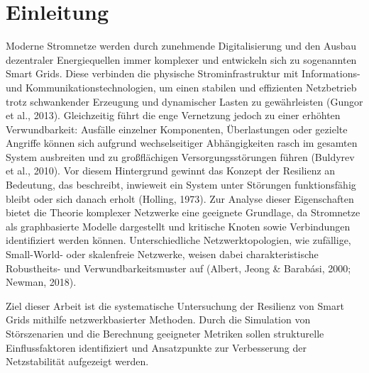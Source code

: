 \section{Einleitung}
Moderne Stromnetze werden durch zunehmende Digitalisierung und den Ausbau dezentraler Energiequellen immer komplexer und entwickeln sich zu sogenannten Smart Grids. Diese verbinden die physische Strominfrastruktur mit Informations- und Kommunikationstechnologien, um einen stabilen und effizienten Netzbetrieb trotz schwankender Erzeugung und dynamischer Lasten zu gewährleisten (Gungor et al., 2013). Gleichzeitig führt die enge Vernetzung jedoch zu einer erhöhten Verwundbarkeit: Ausfälle einzelner Komponenten, Überlastungen oder gezielte Angriffe können sich aufgrund wechselseitiger Abhängigkeiten rasch im gesamten System ausbreiten und zu großflächigen Versorgungsstörungen führen (Buldyrev et al., 2010). Vor diesem Hintergrund gewinnt das Konzept der Resilienz an Bedeutung, das beschreibt, inwieweit ein System unter Störungen funktionsfähig bleibt oder sich danach erholt (Holling, 1973). Zur Analyse dieser Eigenschaften bietet die Theorie komplexer Netzwerke eine geeignete Grundlage, da Stromnetze als graphbasierte Modelle dargestellt und kritische Knoten sowie Verbindungen identifiziert werden können. Unterschiedliche Netzwerktopologien, wie zufällige, Small-World- oder skalenfreie Netzwerke, weisen dabei charakteristische Robustheits- und Verwundbarkeitsmuster auf (Albert, Jeong & Barabási, 2000; Newman, 2018).

Ziel dieser Arbeit ist die systematische Untersuchung der Resilienz von Smart Grids mithilfe netzwerkbasierter Methoden. Durch die Simulation von Störszenarien und die Berechnung geeigneter Metriken sollen strukturelle Einflussfaktoren identifiziert und Ansatzpunkte zur Verbesserung der Netzstabilität aufgezeigt werden.
